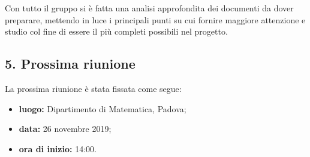 Con tutto il gruppo si è fatta una analisi approfondita dei documenti da dover preparare, mettendo in luce i principali punti su cui fornire maggiore attenzione e studio col fine di essere il più completi possibili nel progetto.

\subsection*{5. Prossima riunione}

La prossima riunione è stata fissata come segue:
\begin{itemize}
	\item \textbf{luogo:} Dipartimento di Matematica, Padova;
	\item \textbf{data:} 26 novembre 2019;
	\item \textbf{ora di inizio:} 14:00.
\end{itemize}
